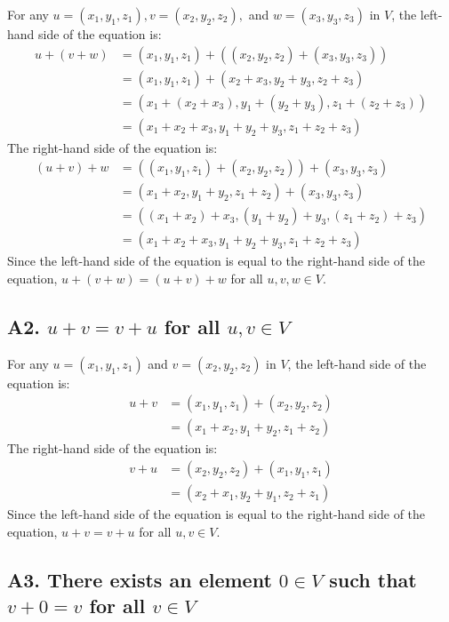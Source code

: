 \documentclass[
  letterpaper,
  DIV=11,
  numbers=noendperiod]{scrartcl}
\begin{document}
For any \(u = (x_1, y_1, z_1), v = (x_2, y_2, z_2),\) and
\(w = (x_3, y_3, z_3)\) in \(V\), the left-hand side of the equation is:
\begin{align*}
u+(v+w) &= (x_1, y_1, z_1) + ((x_2, y_2, z_2) + (x_3, y_3, z_3)) \\
&= (x_1, y_1, z_1) + (x_2+x_3, y_2+y_3, z_2+z_3) \\
&= (x_1+(x_2+x_3), y_1+(y_2+y_3), z_1+(z_2+z_3)) \\
&= (x_1+x_2+x_3, y_1+y_2+y_3, z_1+z_2+z_3)
\end{align*} The right-hand side of the equation is: \begin{align*}
(u+v)+w &= ((x_1, y_1, z_1) + (x_2, y_2, z_2)) + (x_3, y_3, z_3) \\
&= (x_1+x_2, y_1+y_2, z_1+z_2) + (x_3, y_3, z_3) \\
&= ((x_1+x_2)+x_3, (y_1+y_2)+y_3, (z_1+z_2)+z_3) \\
&= (x_1+x_2+x_3, y_1+y_2+y_3, z_1+z_2+z_3)
\end{align*} Since the left-hand side of the equation is equal to the
right-hand side of the equation, \(u+(v+w)=(u+v)+w\) for all
\(u,v,w \in V\).

\subsection{\texorpdfstring{A2. \(u+v = v+u\) for all
\(u,v \in V\)}{A2. u+v = v+u for all u,v \textbackslash in V}}\label{a2.-uv-vu-for-all-uv-in-v}

For any \(u=(x_1,y_1,z_1)\) and \(v=(x_2,y_2,z_2)\) in \(V\), the
left-hand side of the equation is: \begin{align*}
u+v &= (x_1, y_1, z_1) + (x_2, y_2, z_2) \\
&= (x_1+x_2, y_1+y_2, z_1+z_2)
\end{align*} The right-hand side of the equation is: \begin{align*}
v+u &= (x_2, y_2, z_2) + (x_1, y_1, z_1) \\
&= (x_2+x_1, y_2+y_1, z_2+z_1)
\end{align*} Since the left-hand side of the equation is equal to the
right-hand side of the equation, \(u+v = v+u\) for all \(u,v \in V\).

\subsection{\texorpdfstring{A3. There exists an element \(0 \in V\) such
that \(v+0=v\) for all
\(v \in V\)}{A3. There exists an element 0 \textbackslash in V such that v+0=v for all v \textbackslash in V}}\label{a3.-there-exists-an-element-0-in-v-such-that-v0v-for-all-v-in-v}
\end{document}
